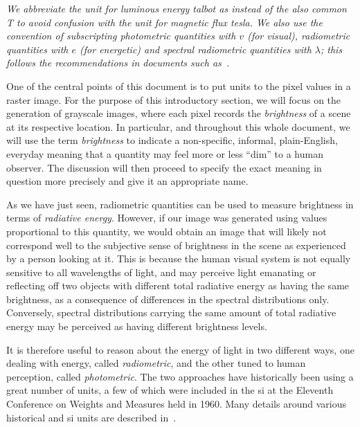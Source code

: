 \begin{table}
{}
\vskip 1mm
{\footnotesize\it We abbreviate the unit for luminous energy \textit{talbot} as
\unit{\talbot} instead of the also common \unit{\tesla} to avoid confusion with the
unit for magnetic flux \textit{tesla}.
We also use the convention of subscripting photometric quantities
with $v$ (for \textit{visual}), radiometric quantities with $e$ (for
\textit{energetic}) and spectral radiometric quantities with $\lambda$;
this follows the recommendations in documents such as~\cite{united1967usa}.}
\end{table}

One of the central points of this document is to put units to the pixel
values in a raster image. 
For the purpose of this introductory section, we will focus on the generation of grayscale images, where each pixel records the \textsl{\gls{brightness}} of a scene at its respective location. In particular, and throughout this whole document, we will use the term \textsl{brightness} to indicate a non-specific, informal, plain-English, everyday meaning that a quantity may feel more or less ``dim'' to a human observer. 
The discussion will then proceed to specify the exact meaning in question more precisely and give it an appropriate name.

As we have just seen, radiometric quantities can be used to measure brightness in terms of \emph{radiative energy}.
However, if our image was generated using values proportional to this quantity,
we would obtain an image that will likely not correspond well to the subjective sense of brightness in the scene as experienced by a person looking at it. 
This is because the human visual system is not equally sensitive to all wavelengths
of light, and may perceive light emanating or reflecting off two objects with different total radiative energy as having the same brightness, as a consequence of differences in the spectral distributions only. 
Conversely, spectral distributions carrying the same amount
of total radiative energy may be perceived as having different brightness levels.

It is therefore useful to reason about the energy of light in two
different ways, one dealing with energy, called \textsl{radiometric}, and the
other tuned to human perception, called \textsl{photometric}. The two approaches
have historically been using a great number of units, a few of which were
included in the \gls{si} at the Eleventh Conference on Weights and Measures
held in 1960.  Many details around various historical and \gls{si} units are
described in~\cite{Meyer-Arendt:68}.

